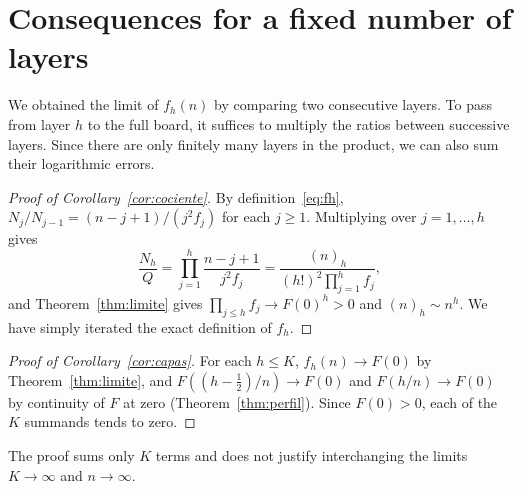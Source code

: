 \section{Consequences for a fixed number of layers}\label{sec:corolarios}

We obtained the limit of $f_h(n)$ by comparing two consecutive layers. To pass from layer $h$ to the full
board, it suffices to
multiply the ratios between successive layers. Since there are only finitely many layers in the product, we
can also sum their
logarithmic errors.

\begin{proof}[Proof of Corollary~\ref{cor:cociente}] By definition~\eqref{eq:fh},
$N_j/N_{j-1}=(n-j+1)/(j^2f_j)$ for each $j\ge1$.
Multiplying over $j=1,\dots,h$ gives \[
 \frac{N_h}{Q}=\prod_{j=1}^h\frac{n-j+1}{j^2f_j}=\frac{(n)_h}{(h!)^2\prod_{j=1}^hf_j},
\] and Theorem~\ref{thm:limite} gives $\prod_{j\le h}f_j\to F(0)^h>0$ and $(n)_h\sim n^h$. We have simply
iterated the exact definition
of $f_h$. \end{proof}

\begin{proof}[Proof of Corollary~\ref{cor:capas}] For each $h\le K$, $f_h(n)\to F(0)$ by
Theorem~\ref{thm:limite}, and
$F((h-\frac12)/n)\to F(0)$ and $F(h/n)\to F(0)$ by continuity of $F$ at zero (Theorem~\ref{thm:perfil}).
Since $F(0)>0$, each of the
$K$ summands tends to zero. \end{proof}

The proof sums only $K$ terms and does not justify interchanging the limits $K\to\infty$ and $n\to\infty$.
